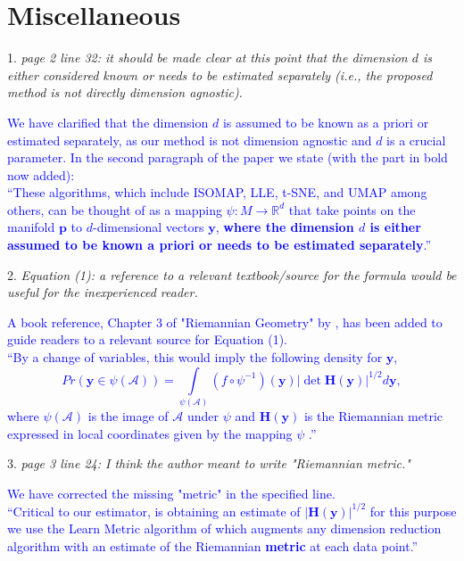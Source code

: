 \documentclass{article}
\begin{document}
\section*{Miscellaneous}

1. \textit{page 2 line 32: it should be made clear at this point that the dimension \(d\) is either considered known or needs to be estimated separately (i.e., the proposed method is not directly dimension agnostic).}

   \textcolor{blue}{
   We have clarified that the dimension \(d\) is assumed to be known as a priori or estimated separately, as our method is not dimension agnostic and $d$ is a crucial parameter. In the second paragraph of the paper we state (with the part in bold now added):\\
  ``These algorithms, which include ISOMAP, LLE, t-SNE, and UMAP among others, can be thought of as a mapping \(\psi:M\rightarrow \mathbb{R}^d\) that take points on the manifold \(\bm{p}\) to \(d\)-dimensional vectors \(\bm{y}\), \textbf{where the dimension $d$ is either assumed to be known a priori or needs to be estimated separately}.'' }

2. \textit{Equation (1): a reference to a relevant textbook/source for the formula would be useful for the inexperienced reader.}

   \textcolor{blue}{A book reference, Chapter 3 of "Riemannian Geometry" by \textcite{doCarmo1992-rm}, has been added to guide readers to a relevant source for Equation (1). \\
   ``By a change of variables, this would imply the following density for \(\bm{y}\),
\begin{equation}
\label{eq:changevar}
Pr(\bm{y}\in\psi(\mathcal{A}))=\int\limits_{\psi(\mathcal{A})} (f\circ\psi^{-1})(\bm{y})|\det \bm{H}(\bm{y})|^{1/2}d\bm{y},
\end{equation}
where \(\psi(\mathcal{A})\) is the image of \(\mathcal{A}\) under \(\psi\) and \(\bm{H}(\bm{y})\) is the Riemannian metric expressed in local coordinates given by the mapping \(\psi\) \autocite{doCarmo1992-rm}.''
   }

3. \textit{page 3 line 24: I think the author meant to write "Riemannian metric."}

   \textcolor{blue}{%
   We have corrected the missing "metric" in the specified line. \\
   ``Critical to our estimator, is obtaining an estimate of $|\bm{H}(\bm{y})|^{1/2}$ for this purpose we use the Learn Metric algorithm of \textcite{Perrault-Joncas2013-pq} which augments any dimension reduction algorithm with an estimate of the Riemannian \textbf{metric} at each data point.''
   }
\end{document}
